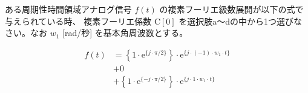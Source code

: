 ある周期性時間領域アナログ信号 $f(t)$ の複素フーリエ級数展開が以下の式で与えられている時、
複素フーリエ係数 $\textrm{C}[0]$ を選択肢a〜dの中から1つ選びなさい。なお $w_1$ [rad/秒] を基本角周波数とする。

\begin{align*}
f(t) 
&= \left \{ 1 \cdot \textrm{e}^{\{ j \cdot \pi/2 \}} \right \} \cdot \textrm{e}^{\{ j \cdot (-1) \cdot w_1 \cdot t \}} \\
&+ 0 \\
&+ \left \{ 1 \cdot \textrm{e}^{\{-j \cdot \pi/2 \}} \right \} \cdot \textrm{e}^{\{ j \cdot    1 \cdot w_1 \cdot t \}} 
\end{align*}
